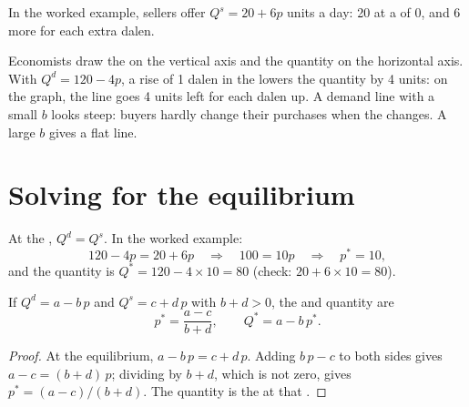 In the worked example, sellers offer $Q^s = 20 + 6p$ units a day: 20 at a  of 0, and 6 more for
each extra dalen.

\begin{measure}
Economists draw the  on the vertical axis and the quantity on the horizontal axis. With $Q^d = 120
- 4p$, a rise of 1 dalen in the  lowers the quantity by 4 units: on the graph, the line goes 4
units left for each dalen up. A demand line with a small $b$ looks steep: buyers hardly change their
purchases when the  changes. A large $b$ gives a flat line.
\end{measure}

\section{Solving for the equilibrium}

At the , $Q^d = Q^s$. In the worked example:
\[
120 - 4p = 20 + 6p \quad\Longrightarrow\quad 100 = 10p \quad\Longrightarrow\quad p^* = 10,
\]
and the quantity is $Q^* = 120 - 4 \times 10 = 80$ (check: $20 + 6 \times 10 = 80$).

\begin{proposition}\label{prop:g9:demand-and-supply-equations:equilibrium}
If $Q^d = a - b\,p$ and $Q^s = c + d\,p$ with $b + d > 0$, the  and quantity are
\[
p^* = \frac{a - c}{b + d}, \qquad Q^* = a - b\,p^*.
\]
\end{proposition}

\begin{proof}
At the equilibrium, $a - b\,p = c + d\,p$. Adding $b\,p - c$ to both sides gives $a - c = (b + d)\,p$;
dividing by $b + d$, which is not zero, gives $p^* = (a - c)/(b + d)$. The quantity is the  at that .
\end{proof}

